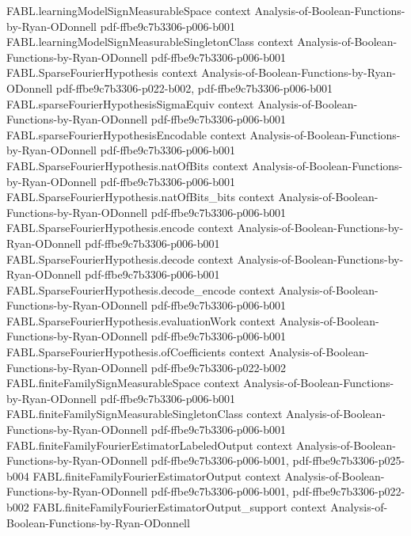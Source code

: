 \begin{theorem}
\proofstep
  {FABL.learningModelSignMeasurableSpace}
  {context}
  {Analysis-of-Boolean-Functions-by-Ryan-ODonnell}
  {pdf-ffbe9c7b3306-p006-b001}
\proofstep
  {FABL.learningModelSignMeasurableSingletonClass}
  {context}
  {Analysis-of-Boolean-Functions-by-Ryan-ODonnell}
  {pdf-ffbe9c7b3306-p006-b001}
\proofstep
  {FABL.SparseFourierHypothesis}
  {context}
  {Analysis-of-Boolean-Functions-by-Ryan-ODonnell}
  {pdf-ffbe9c7b3306-p022-b002,
    pdf-ffbe9c7b3306-p006-b001}
\proofstep
  {FABL.sparseFourierHypothesisSigmaEquiv}
  {context}
  {Analysis-of-Boolean-Functions-by-Ryan-ODonnell}
  {pdf-ffbe9c7b3306-p006-b001}
\proofstep
  {FABL.sparseFourierHypothesisEncodable}
  {context}
  {Analysis-of-Boolean-Functions-by-Ryan-ODonnell}
  {pdf-ffbe9c7b3306-p006-b001}
\proofstep
  {FABL.SparseFourierHypothesis.natOfBits}
  {context}
  {Analysis-of-Boolean-Functions-by-Ryan-ODonnell}
  {pdf-ffbe9c7b3306-p006-b001}
\proofstep
  {FABL.SparseFourierHypothesis.natOfBits_bits}
  {context}
  {Analysis-of-Boolean-Functions-by-Ryan-ODonnell}
  {pdf-ffbe9c7b3306-p006-b001}
\proofstep
  {FABL.SparseFourierHypothesis.encode}
  {context}
  {Analysis-of-Boolean-Functions-by-Ryan-ODonnell}
  {pdf-ffbe9c7b3306-p006-b001}
\proofstep
  {FABL.SparseFourierHypothesis.decode}
  {context}
  {Analysis-of-Boolean-Functions-by-Ryan-ODonnell}
  {pdf-ffbe9c7b3306-p006-b001}
\proofstep
  {FABL.SparseFourierHypothesis.decode_encode}
  {context}
  {Analysis-of-Boolean-Functions-by-Ryan-ODonnell}
  {pdf-ffbe9c7b3306-p006-b001}
\proofstep
  {FABL.SparseFourierHypothesis.evaluationWork}
  {context}
  {Analysis-of-Boolean-Functions-by-Ryan-ODonnell}
  {pdf-ffbe9c7b3306-p006-b001}
\proofstep
  {FABL.SparseFourierHypothesis.ofCoefficients}
  {context}
  {Analysis-of-Boolean-Functions-by-Ryan-ODonnell}
  {pdf-ffbe9c7b3306-p022-b002}
\proofstep
  {FABL.finiteFamilySignMeasurableSpace}
  {context}
  {Analysis-of-Boolean-Functions-by-Ryan-ODonnell}
  {pdf-ffbe9c7b3306-p006-b001}
\proofstep
  {FABL.finiteFamilySignMeasurableSingletonClass}
  {context}
  {Analysis-of-Boolean-Functions-by-Ryan-ODonnell}
  {pdf-ffbe9c7b3306-p006-b001}
\proofstep
  {FABL.finiteFamilyFourierEstimatorLabeledOutput}
  {context}
  {Analysis-of-Boolean-Functions-by-Ryan-ODonnell}
  {pdf-ffbe9c7b3306-p006-b001,
    pdf-ffbe9c7b3306-p025-b004}
\proofstep
  {FABL.finiteFamilyFourierEstimatorOutput}
  {context}
  {Analysis-of-Boolean-Functions-by-Ryan-ODonnell}
  {pdf-ffbe9c7b3306-p006-b001,
    pdf-ffbe9c7b3306-p022-b002}
\proofstep
  {FABL.finiteFamilyFourierEstimatorOutput_support}
  {context}
  {Analysis-of-Boolean-Functions-by-Ryan-ODonnell}

\end{theorem}
